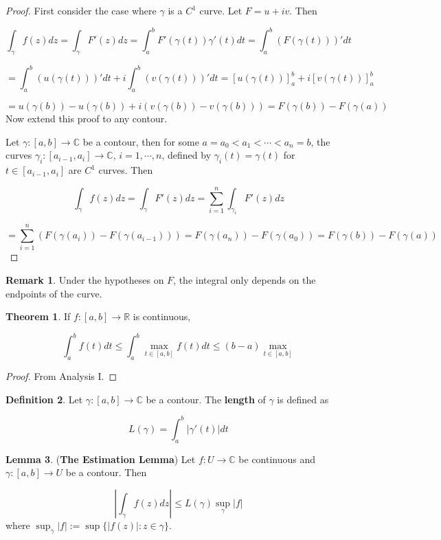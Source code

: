 \documentclass[12pt,a4paper]{article}
\theoremstyle{definition}
\newtheorem{definition}{Definition}[subsection]
\newtheorem{theorem}[definition]{Theorem}
\newtheorem{lemma}[definition]{Lemma}
\newtheorem*{remark}{Remark}
\begin{document}
\begin{proof}
	First consider the case where $\gamma$ is a $C^1$ curve. Let $F = u + iv$. Then

	\[ \int_{\gamma} f(z) dz = \int_{\gamma} F'(z) dz = \int_a^b F'(\gamma(t)) \gamma'(t) dt = \int_a^b (F(\gamma(t)))' dt\]

	\[ = \int_a^b (u(\gamma(t)))' dt + i \int_a^b (v(\gamma(t)))' dt = [u(\gamma(t))]_a^b + i [v(\gamma(t))]_a^b \]

	\[ = u(\gamma(b)) - u(\gamma(b)) + i(v(\gamma(b)) - v(\gamma(b))) = F(\gamma(b)) - F(\gamma(a)) \]
	Now extend this proof to any contour.

	Let $\gamma: [a, b] \rightarrow \mathbb{C}$ be a contour, then for some $a = a_0 < a_1 < \cdots < a_n = b$, the curves $\gamma_i: [a_{i - 1}, a_i] \rightarrow \mathbb{C}$, $i = 1, \cdots, n$, defined by $\gamma_i(t) = \gamma(t)$ for $t \in [a_{i - 1}, a_i]$ are $C^1$ curves. Then

	\[ \int_{\gamma} f(z) dz = \int_{\gamma} F'(z) dz = \sum_{i = 1}^n \int_{\gamma_i} F'(z) dz \]

	\[ = \sum_{i = 1}^n (F(\gamma(a_i)) - F(\gamma(a_{i - 1}))) = F(\gamma(a_n)) - F(\gamma(a_0)) = F(\gamma(b)) - F(\gamma(a)) \]
\end{proof}

\begin{remark}
	Under the hypotheses on $F$, the integral only depends on the endpoints of the curve.
\end{remark}

\begin{theorem}
	If $f: [a, b] \rightarrow \mathbb{R}$ is continuous,
	
	\[\int_a^b f(t) dt \le \int_a^b \max_{t \in [a, b]} f(t) dt \le (b - a) \max_{t \in [a, b]}\]
\end{theorem}

\begin{proof}
	From Analysis I.
\end{proof}

\begin{definition}
	Let $\gamma: [a, b] \rightarrow \mathbb{C}$ be a contour. The \textbf{length} of $\gamma$ is defined as

	\[L(\gamma) = \int_a^b |\gamma'(t)| dt\]
\end{definition}

\begin{lemma}
	(\textbf{The Estimation Lemma}) Let $f: U \rightarrow \mathbb{C}$ be continuous and $\gamma: [a, b] \rightarrow U$ be a contour. Then

	\[ \left | \int_{\gamma} f(z) dz \right | \le L(\gamma) \sup_{\gamma} |f| \]
	where $\sup_{\gamma} |f| := \sup \{ |f(z)|: z \in \gamma \}$.
\end{lemma}
\end{document}

